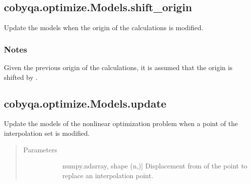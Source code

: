\documentclass[letterpaper,10pt,english]{sphinxmanual}
\begin{document}
\begin{fulllineitems}
\subsection{cobyqa.optimize.Models.shift\_origin}
\label{\detokenize{refs/generated/cobyqa.optimize.Models.shift_origin:cobyqa-optimize-models-shift-origin}}\label{\detokenize{refs/generated/cobyqa.optimize.Models.shift_origin::doc}}

\begin{fulllineitems}
\label{\detokenize{refs/generated/cobyqa.optimize.Models.shift_origin:cobyqa.optimize.Models.shift_origin}}
\sphinxAtStartPar
Update the models when the origin of the calculations is modified.
\subsubsection*{Notes}

\sphinxAtStartPar
Given  the previous origin of the calculations, it is assumed
that the origin is shifted by .

\end{fulllineitems}



\subsection{cobyqa.optimize.Models.update}
\label{\detokenize{refs/generated/cobyqa.optimize.Models.update:cobyqa-optimize-models-update}}\label{\detokenize{refs/generated/cobyqa.optimize.Models.update::doc}}

\begin{fulllineitems}
\label{\detokenize{refs/generated/cobyqa.optimize.Models.update:cobyqa.optimize.Models.update}}
\sphinxAtStartPar
Update the models of the nonlinear optimization problem when a point of
the interpolation set is modified.
\begin{quote}\begin{description}
\item[{Parameters}] \leavevmode\begin{description}
\item[{}] \leavevmode{[}numpy.ndarray, shape (n,){]}
\sphinxAtStartPar
Displacement from  of the point to replace an interpolation
point.


\end{description}
\end{description}
\end{quote}
\end{fulllineitems}
\end{fulllineitems}
\end{document}
